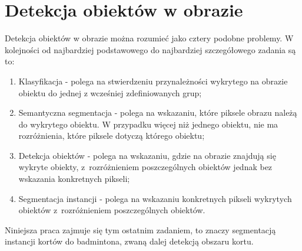 \section{Detekcja obiektów w obrazie}
\label{sec:typy_detekcji}

Detekcja obiektów w obrazie można rozumieć jako cztery podobne problemy.
W kolejności od najbardziej podstawowego do najbardziej szczegółowego zadania są to:

\begin{enumerate}
	\item Klasyfikacja - polega na stwierdzeniu przynależności wykrytego na obrazie obiektu do jednej z wcześniej zdefiniowanych grup;
  \item Semantyczna segmentacja - polega na wskazaniu, które piksele obrazu należą do wykrytego obiektu.
        W przypadku więcej niż jednego obiektu, nie ma rozróżnienia, które piksele dotyczą którego obiektu;
	\item Detekcja obiektów - polega na wskazaniu, gdzie na obrazie znajdują się wykryte obiekty, z~rozróżnieniem poszczególnych obiektów jednak bez wskazania konkretnych pikseli;
	\item Segmentacja instancji - polega na wskazaniu konkretnych pikseli wykrytych obiektów z~rozróżnieniem poszczególnych obiektów.
\end{enumerate}

Niniejsza praca zajmuje się tym ostatnim zadaniem, to znaczy segmentacją instancji kortów do badmintona, zwaną dalej detekcją obszaru kortu.
